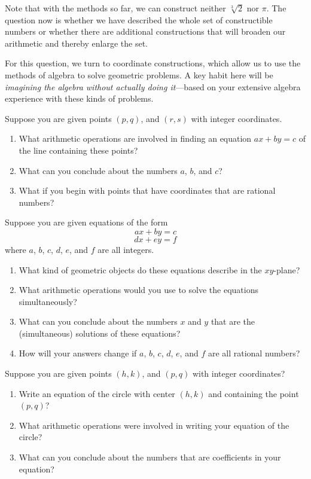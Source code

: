 Note that with the methods so far, we can construct neither $\sqrt[3]{2}$ nor $\pi$.  The question now is whether we have described the whole set of constructible numbers or whether there are additional constructions that will broaden our arithmetic and thereby enlarge the set.  

For this question, we turn to coordinate constructions, which allow us to use the methods of algebra to solve geometric problems.  A key habit here will be \emph{imagining the algebra without actually doing it}---based on your extensive algebra experience with these kinds of problems.  

\begin{prob}
Suppose you are given points $(p, q)$, and $(r, s)$ with integer coordinates.  
\begin{enumerate}
\item What arithmetic operations are involved in finding an equation $ax+by=c$ of the line containing these points?  
\item What can you conclude about the numbers $a$, $b$, and $c$? 
\item What if you begin with points that have coordinates that are rational numbers?  
\end{enumerate}
\end{prob}

\begin{prob}
Suppose you are given equations of the form 
$$ax+by = c$$
$$dx+ey=f$$
where $a$, $b$, $c$, $d$, $e$, and $f$ are all integers.  
\begin{enumerate}
\item What kind of geometric objects do these equations describe in the $xy$-plane?  
\item What arithmetic operations would you use to solve the equations simultaneously? 
\item What can you conclude about the numbers $x$ and $y$ that are the (simultaneous) solutions of these equations?  
\item How will your answers change if $a$, $b$, $c$, $d$, $e$, and $f$ are all rational numbers?  
\end{enumerate}
\end{prob}

\begin{prob}
Suppose you are given points $(h, k)$, and $(p, q)$ with integer coordinates?  
\begin{enumerate}
\item Write an equation of the circle with center $(h, k)$ and containing the point $(p, q)$?  
\item What arithmetic operations were involved in writing your equation of the circle?  
\item What can you conclude about the numbers that are coefficients in your equation?   
\end{enumerate}
\end{prob}

